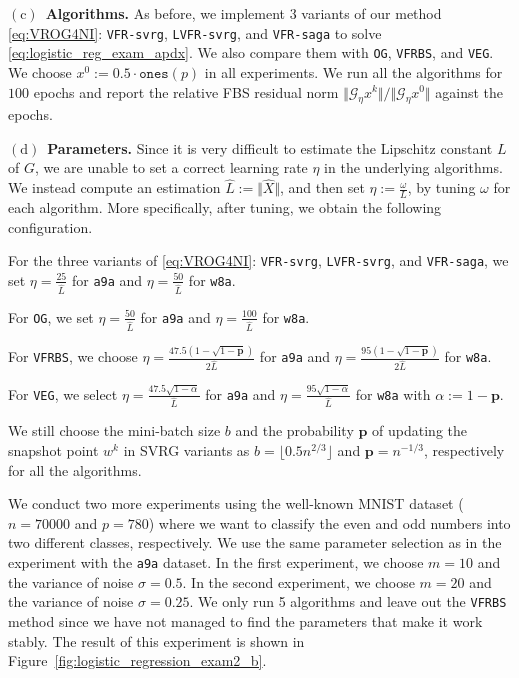 \documentclass{article}
\newcommand{\norms}[1]{\Vert#1\Vert}
\newcommand{\Gc}{\mathcal{G}}
\newcommand{\mbf}[1]{\mathbf{#1}}
\theoremstyle{plain}
\theoremstyle{definition}
\theoremstyle{remark}
\begin{document}
$\mathrm{(c)}$~\textbf{Algorithms.}
As before, we implement $3$ variants of our method \eqref{eq:VROG4NI}: \texttt{VFR-svrg}, \texttt{LVFR-svrg}, and \texttt{VFR-saga} to solve \eqref{eq:logistic_reg_exam_apdx}.
We also compare them with \texttt{OG}, \texttt{VFRBS}, and \texttt{VEG}.
We choose $x^0 := 0.5\cdot\texttt{ones}(p)$ in all experiments. 
We run all the algorithms for $100$ epochs and report the relative FBS residual norm $\norms{\Gc_{\eta}x^k}/\norms{\Gc_{\eta}x^0}$ against the epochs.


$\mathrm{(d)}$~\textbf{Parameters.}
Since it is very difficult to estimate the Lipschitz constant $L$ of $G$, we are unable to set a correct learning rate $\eta$ in the underlying algorithms.
We instead compute an estimation $\hat{L} := \norms{\hat{X}}$, and then set $\eta := \frac{\omega}{L}$, by tuning $\omega$ for each algorithm.
More specifically, after tuning, we obtain the following configuration.
\begin{compactitem}
\item For the three variants of \eqref{eq:VROG4NI}: \texttt{VFR-svrg}, \texttt{LVFR-svrg}, and \texttt{VFR-saga},  we set $\eta = \frac{25}{\hat{L}}$ for \texttt{a9a} and $\eta = \frac{50}{\hat{L}}$ for \texttt{w8a}.
\item For \texttt{OG}, we set $\eta = \frac{50}{\hat{L}}$ for \texttt{a9a} and $\eta = \frac{100}{\hat{L}}$ for \texttt{w8a}.
\item For \texttt{VFRBS}, we choose $\eta = \frac{47.5(1 - \sqrt{1 - \mbf{p}})}{2\hat{L}}$ for \texttt{a9a} and $\eta = \frac{95(1 - \sqrt{1 - \mbf{p}})}{2\hat{L}}$ for \texttt{w8a}.
\item For \texttt{VEG}, we select $\eta = \frac{47.5\sqrt{1-\alpha}}{\hat{L}}$ for \texttt{a9a} and $\eta = \frac{95\sqrt{1-\alpha}}{\hat{L}}$ for \texttt{w8a} with $\alpha := 1 - \mbf{p}$.
\end{compactitem}
We still choose the mini-batch size $b$ and the probability $\mbf{p}$ of updating the snapshot point $w^k$ in SVRG variants as $b = \lfloor 0.5 n^{2/3}\rfloor$ and $\mbf{p} = n^{-1/3}$, respectively  for all the algorithms.

We conduct two more experiments using the well-known MNIST dataset ($n=70000$ and $p = 780$) where we want to classify the even and odd numbers into two different classes, respectively.
We use the same parameter selection as in the experiment with the \texttt{a9a} dataset.
In the first experiment, we choose $m = 10$ and the variance of noise $\sigma = 0.5$.
In the second experiment, we choose $m=20$ and the variance of noise $\sigma = 0.25$.
We only run 5 algorithms and leave out the \texttt{VFRBS} method since we have not managed to find the parameters that make it work stably.
The result of this experiment is shown in Figure~\ref{fig:logistic_regression_exam2_b}.
\end{document}
